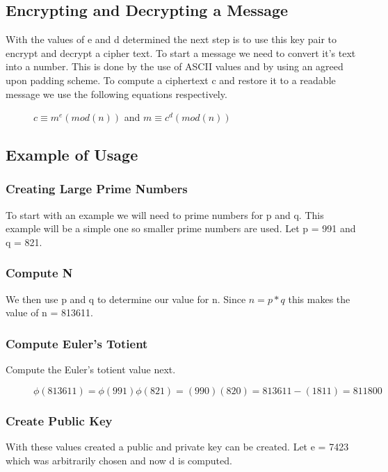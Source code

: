 \documentclass[conference]{IEEEtran}
\begin{document}
\subsection{Encrypting and Decrypting a Message}

With the values of e and d determined the next step is to use this key pair to encrypt and decrypt a cipher text. To start a message we need to convert it's text into a number. This is done by the use of ASCII values and by using an agreed upon padding scheme. To compute a ciphertext c and restore it to a readable message we use the following equations respectively.

\begin{figure}[H]
	\begin{center}
		$c\equiv {m}^{e}\left(mod\left(n\right)\right)$ and
		$m\equiv {c}^{d}\left(mod\left(n\right)\right)$
	\end{center}
\end{figure}

\subsection{Example of Usage}
\subsubsection{Creating Large Prime Numbers}
To start with an example we will need to prime numbers for p and q. This example will be a simple one so smaller prime numbers are used. Let p = 991 and q = 821. 
\subsubsection{Compute N}
We then use p and q to determine our value for n. Since $n = p * q$ this makes the value of n = 813611.
\subsubsection{Compute Euler's Totient} 
Compute the Euler's totient value next.
\begin{figure}[h]
	\begin{center}
$\phi \left(813611\right)=\phi \left(991\right)\phi \left(821\right)=\left(990\right)\left(820\right)=813611-\left(1811\right) = 811800$
\end{center}
\end{figure} 
\subsubsection{Create Public Key}
With these values created a public and private key can be created. Let e = 7423 which was arbitrarily chosen and now d is computed.
\end{document}
